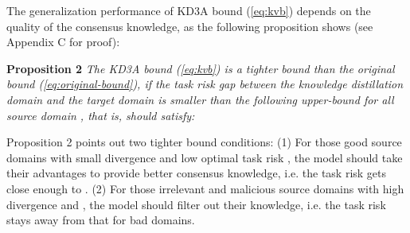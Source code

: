 \documentclass{article}
\begin{document}
The generalization performance of KD3A bound (\ref{eq:kvb}) depends on the quality of the consensus knowledge, as the following proposition shows (see Appendix C for proof):

\textbf{Proposition 2} \textit{The KD3A bound (\ref{eq:kvb}) is a tighter bound than the original bound (\ref{eq:original-bound}), if the task risk gap between the knowledge distillation domain  and the target domain  is smaller than the following upper-bound for all source domain , that is,  should satisfy:}


Proposition 2 points out two tighter bound conditions: (1) For those good source domains with small divergence and low optimal task risk , the model should take their advantages to provide better consensus knowledge, i.e. the task risk  gets close enough to . (2) For those irrelevant and malicious source domains with high divergence and , the model should filter out their knowledge, i.e. the task risk  stays away from that for bad domains. 
\end{document}

